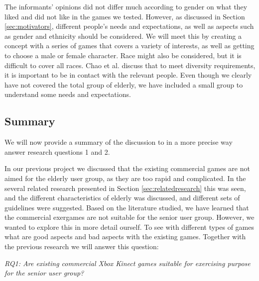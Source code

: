The informants' opinions did not differ much according to gender on what they liked and did not like in the games we tested. However, as discussed in Section \ref{sec:motivators}, different people's needs and expectations, as well as aspects such as gender and ethnicity should be considered. We will meet this by creating a concept with a series of games that covers a variety of interests, as well as getting to choose a male or female character. Race might also be considered, but it is difficult to cover all races. Chao et al. \cite{chao} discuss that to meet diversity requirements, it is important to be in contact with the relevant people. Even though we clearly have not covered the total group of elderly, we have included a small group to understand some needs and expectations.

\subsection{Summary}
We will now provide a summary of the discussion to in a more precise way answer research questions 1 and 2. 

In our previous project \cite{project} we discussed that the existing commercial games are not aimed for the elderly user group, as they are too rapid and complicated. In the several related research presented in Section \ref{sec:relatedresearch} this was seen, and the different characteristics of elderly was discussed, and different sets of guidelines were suggested. Based on the literature studied, we have learned that the commercial exergames are not suitable for the senior user group. However, we wanted to explore this in more detail ourself. To see with different types of games what are good aspects and bad aspects with the existing games. Together with the previous research we will answer this question:

\emph{RQ1: Are existing commercial Xbox Kinect games suitable for exercising purpose for the senior user group?}

